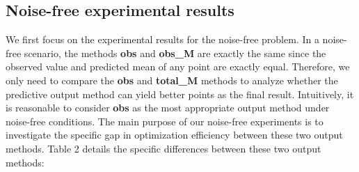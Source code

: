 \documentclass{article}
\begin{document}
  \subsection{Noise-free experimental results}
  \hspace{2em}We first focus on the experimental results for the noise-free problem. In a noise-free scenario, the methods \textbf{obs} and \textbf{obs\_M} are exactly the same since the observed value and predicted mean of any point are exactly equal. Therefore, we only need to compare the \textbf{obs} and \textbf{total\_M} methods to analyze whether the predictive output method can yield better points as the final result. Intuitively, it is reasonable to consider \textbf{obs} as the most appropriate output method under noise-free conditions. The main purpose of our noise-free experiments is to investigate the specific gap in optimization efficiency between these two output methods. Table 2 details the specific differences between these two output methods:
\end{document}
